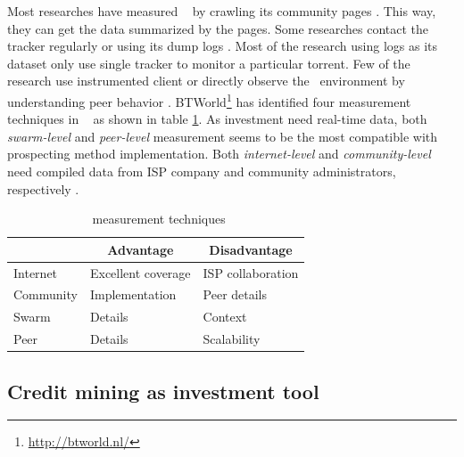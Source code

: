 Most researches have measured \bt~ by crawling its community pages \cite{2013:survivepriv:jia, 2005:bittorrentcooperation:andrade, 2014:userbehaviourprivate:jia, 2010:pubpriv:meulpolder, 2014:sustainabilitytorrent:chen, 2012:economicbt:kash, 2013:investmentcm:capota, 2009:demandsupplyres:andrade, 2011:interswarm:capota}. This way, they can get the data summarized by the pages. Some researches contact the tracker regularly or using its dump logs \cite{2011:yoshida:crawlbtnet, 2005:bittorrentcooperation:andrade,  2015:freeriderinbtcommunity:das, 2011:interswarm:capota}. Most of the research using logs as its dataset only use single tracker to monitor a particular torrent. Few of the research use instrumented client or directly observe the \bt~environment by understanding peer behavior \cite{2010:pubpriv:meulpolder, 2013:swarmevolution:su}. BTWorld\footnote{\url{http://btworld.nl/}} has identified four measurement techniques in \bt~\cite{2010:btworld:wojciechowski} as shown in table \ref{tbl:btmeasuremethod}. As investment need real-time data, both \textit{swarm-level} and \textit{peer-level} measurement seems to be the most compatible with prospecting method implementation. Both \textit{internet-level} and \textit{community-level} need compiled data from ISP company and community administrators, respectively . 

\begin{table}[ht]
	\centering
	\caption{\bt~measurement techniques \cite{2010:btworld:wojciechowski}}
	\label{tbl:btmeasuremethod}
	\begin{tabular}{|l|l|l|}
		\hline
		\rowcolor[HTML]{C0C0C0} 
		\multicolumn{1}{|c|}{\cellcolor[HTML]{C0C0C0}\textbf{Level}} & \multicolumn{1}{c|}{\cellcolor[HTML]{C0C0C0}\textbf{Advantage}} & \multicolumn{1}{c|}{\cellcolor[HTML]{C0C0C0}\textbf{Disadvantage}} \\ \hline
		Internet & Excellent coverage & ISP collaboration \\ \hline
		Community & Implementation & Peer details \\ \hline
		Swarm & Details & Context \\ \hline
		Peer & Details & Scalability \\ \hline
	\end{tabular}
\end{table}

\subsection{Credit mining as investment tool}

